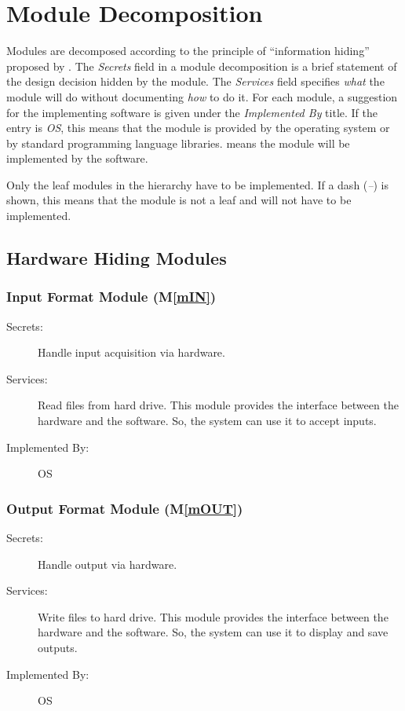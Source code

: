 \documentclass[12pt, titlepage]{article}
\newcommand{\mref}[1]{M\ref{#1}}
\begin{document}
\section{Module Decomposition} \label{SecMD}

Modules are decomposed according to the principle of ``information hiding''
proposed by \citet{ParnasEtAl1984}. The \emph{Secrets} field in a module
decomposition is a brief statement of the design decision hidden by the
module. The \emph{Services} field specifies \emph{what} the module will do
without documenting \emph{how} to do it. For each module, a suggestion for the
implementing software is given under the \emph{Implemented By} title. If the
entry is \emph{OS}, this means that the module is provided by the operating
system or by standard programming language libraries.  \emph{} means the
module will be implemented by the  software.

Only the leaf modules in the hierarchy have to be implemented. If a dash
(\emph{--}) is shown, this means that the module is not a leaf and will not have
to be implemented.

\subsection{Hardware Hiding Modules}

\subsubsection{Input Format Module (\mref{mIN})}

\begin{description}
\item[Secrets:] Handle input acquisition via hardware.
\item[Services:] Read files from hard drive.
  This module provides the interface between the hardware and the
  software. So, the system can use it to accept inputs.
\item[Implemented By:] OS
\end{description}

\subsubsection{Output Format Module (\mref{mOUT})}

\begin{description}
\item[Secrets:] Handle output via hardware.
\item[Services:] Write files to hard drive.
  This module provides the interface between the hardware and the
  software. So, the system can use it to display and save outputs.
\item[Implemented By:] OS
\end{description}
\end{document}
